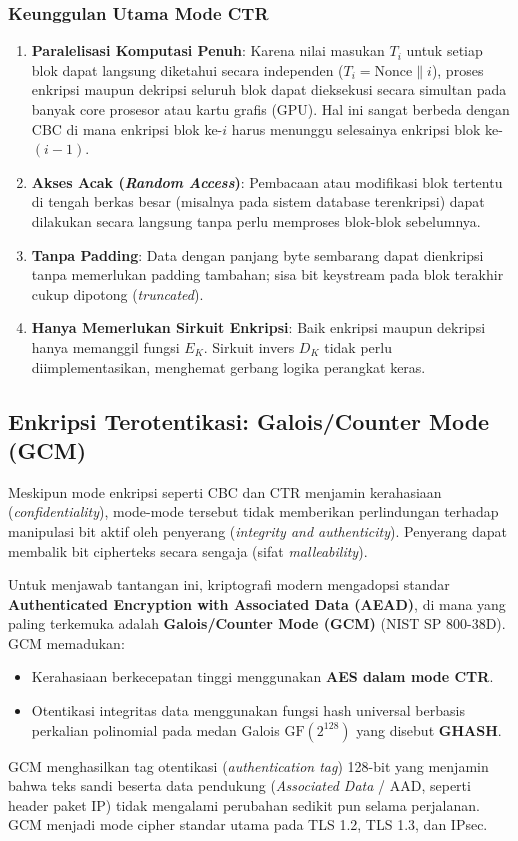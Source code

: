 \subsubsection{Keunggulan Utama Mode CTR}

\begin{enumerate}
  \item \textbf{Paralelisasi Komputasi Penuh}: Karena nilai masukan $T_i$ untuk setiap blok dapat langsung diketahui secara independen ($T_i = \text{Nonce} \parallel i$), proses enkripsi maupun dekripsi seluruh blok dapat dieksekusi secara simultan pada banyak core prosesor atau kartu grafis (GPU). Hal ini sangat berbeda dengan CBC di mana enkripsi blok ke-$i$ harus menunggu selesainya enkripsi blok ke-$(i-1)$.
  \item \textbf{Akses Acak (\textit{Random Access})}: Pembacaan atau modifikasi blok tertentu di tengah berkas besar (misalnya pada sistem database terenkripsi) dapat dilakukan secara langsung tanpa perlu memproses blok-blok sebelumnya.
  \item \textbf{Tanpa Padding}: Data dengan panjang byte sembarang dapat dienkripsi tanpa memerlukan padding tambahan; sisa bit keystream pada blok terakhir cukup dipotong (\textit{truncated}).
  \item \textbf{Hanya Memerlukan Sirkuit Enkripsi}: Baik enkripsi maupun dekripsi hanya memanggil fungsi $E_K$. Sirkuit invers $D_K$ tidak perlu diimplementasikan, menghemat gerbang logika perangkat keras.
\end{enumerate}

\subsection{Enkripsi Terotentikasi: Galois/Counter Mode (GCM)}

Meskipun mode enkripsi seperti CBC dan CTR menjamin kerahasiaan (\textit{confidentiality}), mode-mode tersebut tidak memberikan perlindungan terhadap manipulasi bit aktif oleh penyerang (\textit{integrity and authenticity}). Penyerang dapat membalik bit cipherteks secara sengaja (sifat \textit{malleability}).

Untuk menjawab tantangan ini, kriptografi modern mengadopsi standar \textbf{Authenticated Encryption with Associated Data (AEAD)}, di mana yang paling terkemuka adalah \textbf{Galois/Counter Mode (GCM)} (NIST SP 800-38D). GCM memadukan:
\begin{itemize}
  \item Kerahasiaan berkecepatan tinggi menggunakan \textbf{AES dalam mode CTR}.
  \item Otentikasi integritas data menggunakan fungsi hash universal berbasis perkalian polinomial pada medan Galois $\mathrm{GF}(2^{128})$ yang disebut \textbf{GHASH}.
\end{itemize}
GCM menghasilkan tag otentikasi (\textit{authentication tag}) 128-bit yang menjamin bahwa teks sandi beserta data pendukung (\textit{Associated Data} / AAD, seperti header paket IP) tidak mengalami perubahan sedikit pun selama perjalanan. GCM menjadi mode cipher standar utama pada TLS 1.2, TLS 1.3, dan IPsec.

